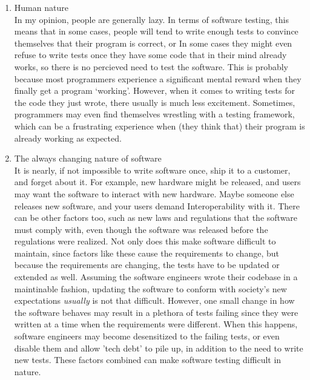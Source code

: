 \documentclass[letterpaper]{article}
\begin{document}
\begin{enumerate}
	\item Human nature\\
		In my opinion, people are generally lazy. In terms of software testing, this means that in some cases,
		people will tend to write enough tests to convince themselves that their program is correct, or 
		In some cases they might even refuse to write tests once they have some code that in their mind already works, 
		so there is no percieved need to test the software.
		This is probably because most programmers experience a significant mental reward when they finally get a program `working'.
		However, when it comes to writing tests for the code they just wrote, there usually is much less excitement.
		Sometimes, programmers may even find themselves wrestling with a testing framework, which can be a frustrating experience when (they think that)
		their program is already working as expected.

	\item The always changing nature of software\\
			It is nearly, if not impossible to write software once, ship it to a customer, and forget about it.
			For example, new hardware might be released, and users may want the software to interact with new hardware.
			Maybe someone else releases new software, and your users demand Interoperability with it. 
			There can be other factors too, such as new laws and regulations that the software must comply with,
			even though the software was released before the regulations were realized. Not only does this make
			software difficult to maintain, since factors like these cause the requirements to change, but because the
			requirements are changing, the tests have to be updated or extended as well. 
			Assuming the software engineers wrote their codebase in a maintinable fashion, updating the software
			to conform with society's new expectations \textit{usually} is not that difficult. However, one small change
			in how the software behaves may result in a plethora of tests failing since they were written at a time 
			when the requirements were different. 
			When this happens, software engineers may become desensitized to the failing tests, or even disable them
			and allow 'tech debt' to pile up, in addition to the need to write new tests. These factors combined can make
			software testing difficult in nature. 
\end{enumerate}

\section{}
\end{document}
